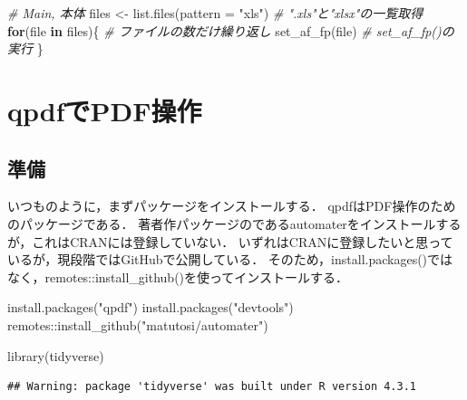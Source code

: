\documentclass[
]{article}
\newenvironment{Shaded}{\begin{snugshade}}{\end{snugshade}}
\newcommand{\AttributeTok}[1]{\textcolor[rgb]{0.77,0.63,0.00}{#1}}
\newcommand{\CommentTok}[1]{\textcolor[rgb]{0.56,0.35,0.01}{\textit{#1}}}
\newcommand{\ControlFlowTok}[1]{\textcolor[rgb]{0.13,0.29,0.53}{\textbf{#1}}}
\newcommand{\FunctionTok}[1]{\textcolor[rgb]{0.00,0.00,0.00}{#1}}
\newcommand{\NormalTok}[1]{#1}
\newcommand{\OtherTok}[1]{\textcolor[rgb]{0.56,0.35,0.01}{#1}}
\newcommand{\SpecialCharTok}[1]{\textcolor[rgb]{0.00,0.00,0.00}{#1}}
\newcommand{\StringTok}[1]{\textcolor[rgb]{0.31,0.60,0.02}{#1}}
\begin{document}
\begin{Shaded}
\begin{Highlighting}[]
  \CommentTok{\# Main, 本体}
\NormalTok{files }\OtherTok{\textless{}{-}} \FunctionTok{list.files}\NormalTok{(}\AttributeTok{pattern =} \StringTok{"xls"}\NormalTok{) }\CommentTok{\# ".xls"と"xlsx"の一覧取得}
\ControlFlowTok{for}\NormalTok{(file }\ControlFlowTok{in}\NormalTok{ files)\{                  }\CommentTok{\# ファイルの数だけ繰り返し}
  \FunctionTok{set\_af\_fp}\NormalTok{(file)                    }\CommentTok{\# set\_af\_fp()の実行}
\NormalTok{\}}
\end{Highlighting}
\end{Shaded}

\hypertarget{qpdf}{%
\section{qpdfでPDF操作}\label{qpdf}}

\hypertarget{ux6e96ux5099-15}{%
\subsection{準備}\label{ux6e96ux5099-15}}

いつものように，まずパッケージをインストールする．
qpdfはPDF操作のためのパッケージである．
著者作パッケージのであるautomaterをインストールするが，これはCRANには登録していない．
いずれはCRANに登録したいと思っているが，現段階ではGitHubで公開している．
そのため，install.packages()ではなく，remotes::install\_github()を使ってインストールする．

\begin{Shaded}
\begin{Highlighting}[]
\FunctionTok{install.packages}\NormalTok{(}\StringTok{"qpdf"}\NormalTok{)}
\FunctionTok{install.packages}\NormalTok{(}\StringTok{"devtools"}\NormalTok{)}
\NormalTok{remotes}\SpecialCharTok{::}\FunctionTok{install\_github}\NormalTok{(}\StringTok{"matutosi/automater"}\NormalTok{)}
\end{Highlighting}
\end{Shaded}

\begin{Shaded}
\begin{Highlighting}[]
\FunctionTok{library}\NormalTok{(tidyverse)}
\end{Highlighting}
\end{Shaded}

\begin{verbatim}
## Warning: package 'tidyverse' was built under R version 4.3.1
\end{verbatim}
\end{document}
